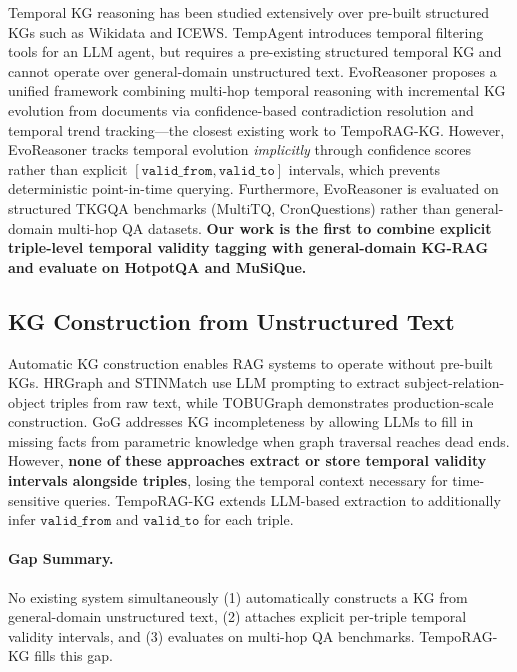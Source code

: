 \documentclass[11pt]{article}
\begin{document}
Temporal KG reasoning has been studied extensively over pre-built structured
KGs such as Wikidata and ICEWS. TempAgent \cite{tempagent2025} introduces
temporal filtering tools for an LLM agent, but requires a pre-existing
structured temporal KG and cannot operate over general-domain unstructured
text. EvoReasoner \cite{evoreasonerevokg2025} proposes a unified framework
combining multi-hop temporal reasoning with incremental KG evolution from
documents via confidence-based contradiction resolution and temporal trend
tracking---the closest existing work to TempoRAG-KG. However, EvoReasoner
tracks temporal evolution \textit{implicitly} through confidence scores
rather than explicit $[\mathtt{valid\_from}, \mathtt{valid\_to}]$ intervals,
which prevents deterministic point-in-time querying. Furthermore,
EvoReasoner is evaluated on structured TKGQA benchmarks (MultiTQ,
CronQuestions) rather than general-domain multi-hop QA datasets.
\textbf{Our work is the first to combine explicit triple-level temporal
validity tagging with general-domain KG-RAG and evaluate on HotpotQA and
MuSiQue.}

\subsection{KG Construction from Unstructured Text}

Automatic KG construction enables RAG systems to operate without pre-built
KGs. HRGraph \cite{hrgraph2024} and STINMatch \cite{stinmatch2023} use LLM
prompting to extract subject-relation-object triples from raw text, while
TOBUGraph \cite{tobugraph2024} demonstrates production-scale construction.
GoG \cite{he2024gog} addresses KG incompleteness by allowing LLMs to fill
in missing facts from parametric knowledge when graph traversal reaches
dead ends. However, \textbf{none of these approaches extract or store
temporal validity intervals alongside triples}, losing the temporal context
necessary for time-sensitive queries. TempoRAG-KG extends LLM-based
extraction to additionally infer $\mathtt{valid\_from}$ and
$\mathtt{valid\_to}$ for each triple.

\paragraph{Gap Summary.}
No existing system simultaneously (1) automatically constructs a KG from
general-domain unstructured text, (2) attaches explicit per-triple temporal
validity intervals, and (3) evaluates on multi-hop QA benchmarks. TempoRAG-KG
fills this gap.
\end{document}
